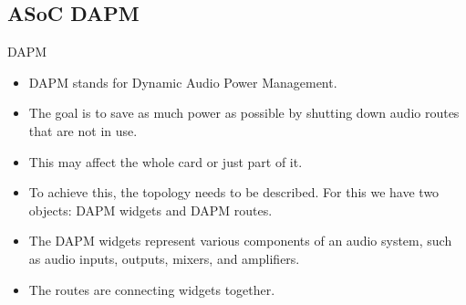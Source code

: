 \subsection{ASoC DAPM}

\begin{frame}{DAPM}
  \begin{itemize}
  \item DAPM stands for Dynamic Audio Power Management.
  \item The goal is to save as much power as possible by shutting down
    audio routes that are not in use.
  \item This may affect the whole card or just part of it.
  \item To achieve this, the topology needs to be described. For this
    we have two objects: DAPM widgets and DAPM routes.
  \item The DAPM widgets represent various components of an audio
    system, such as audio inputs, outputs, mixers, and amplifiers.
  \item The routes are connecting widgets together.
  \end{itemize}
\end{frame}


